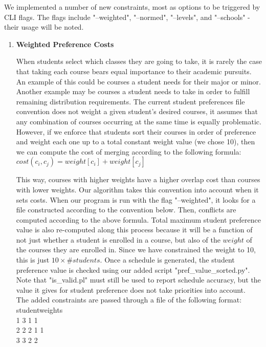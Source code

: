 \documentclass[11pt, oneside]{article}   	%
\begin{document}
We implemented a number of new constraints, most as options to be triggered by CLI flags. The flags include "--weighted", "--normed", "--levels", and "--schools" - their usage will be noted.

\begin{enumerate}
\item{\textbf{Weighted Preference Costs}}

When students select which classes they are going to take, it is rarely the case that taking each course bears equal importance to their academic pursuits. An example of this could be courses a student needs for their major or minor. Another example may be courses a student needs to take in order to fulfill remaining distribution requirements. The current student preferences file convention does not weight a given student's desired courses, it assumes that any combination of courses occurring at the same time is equally problematic. However, if we enforce that students sort their courses in order of preference and weight each one up to a total constant weight value (we chose 10), then we can compute the cost of merging according to the following formula:\\

$cost(c_i,c_j) = weight[c_i] + weight[c_j]$

This way, courses with higher weights have a higher overlap cost than courses with lower weights. Our algorithm takes this convention into account when it sets costs. When our program is run with the flag "--weighted", it looks for a file constructed according to the convention below. Then, conflicts are computed according to the above formula. Total maximum student preference value is also re-computed along this process because it will be a function of not just whether a student is enrolled in a course, but also of the $weight$ of the courses they are enrolled in. Since we have constrained the weight to 10, this is just $10\times \#students$. Once a schedule is generated, the student preference value is checked using our added script "pref\_value\_sorted.py". Note that "is\_valid.pl" must still be used to report schedule accuracy, but the value it gives for student preference does not take priorities into account.\\

The added constraints are passed through a file of the following format:\\

student\qquad weights \\
1 3 1 1 \\
2 2 2 1 1 \\
3 3 2 2  \\


\end{enumerate}
\end{document}
